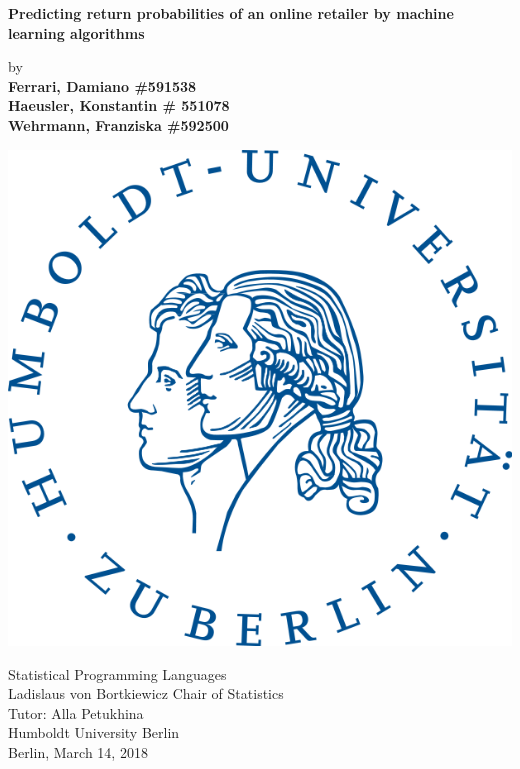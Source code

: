 \begin{center}

    {\Large{\bf Predicting return probabilities of an online retailer by machine learning algorithms}} \vspace{0.5cm}


    {\normalsize by \\\vspace{0.5cm}
    {\bf Ferrari, Damiano \#591538 \\
    Haeusler, Konstantin \# 551078 \\
    Wehrmann, Franziska \#592500} \\
    } \vspace{1cm}

	{	\includegraphics[scale=0.2]{logo_hu.png}}

	\vspace{1cm}	
	
    {\normalsize Statistical Programming Languages \\
    Ladislaus von Bortkiewicz Chair of Statistics \\
    Tutor: Alla Petukhina \\
    Humboldt University Berlin \\
    Berlin,  March 14, 2018}

\end{center}
